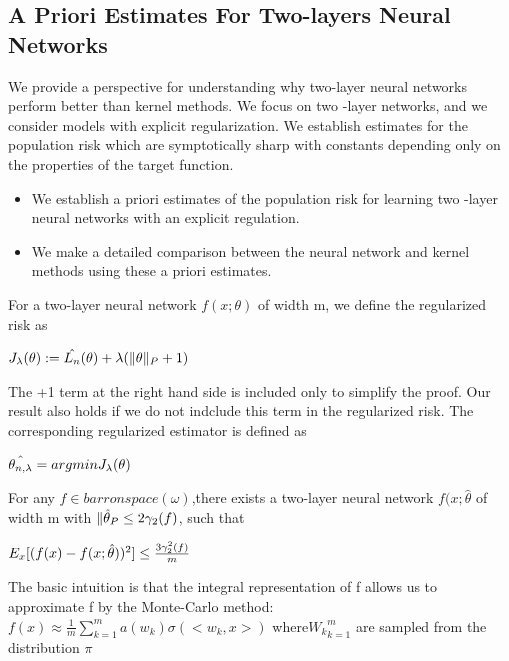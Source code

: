\documentclass{article}
\begin{document}
\subsection{A Priori Estimates For Two-layers Neural Networks}
We provide a perspective for understanding why two-layer neural networks perform better than kernel methods. We focus on two -layer networks, and we consider models with explicit regularization. We establish estimates for the population risk which are symptotically sharp with constants depending only on the properties of the target function. 
\begin{itemize}
\item We establish a priori estimates of the population risk for learning two -layer neural networks with an explicit regulation. 
\item We make a detailed comparison between the neural network and kernel methods using these a priori estimates. 
\end{itemize}

For a two-layer neural network $f(x;\theta)$ of width m, we define the regularized risk as 
\begin{center}
  ${\MakeUppercase{J}_\lambda}(\theta) : = \hat{\MakeUppercase{L}_n}(\theta)+ \lambda(\|\theta\|_P+1)$
\end{center}
The +1 term at the right hand side is included only to simplify the proof. Our result also holds if we do not indclude this term in  the regularized risk. The corresponding regularized estimator is defined as 
\begin{center}
  $\hat{\theta_{n,\lambda}} = argmin{{\MakeUppercase{J}_\lambda}(\theta)}$
\end{center}

For any $f \in barron space(\omega)$,there exists a two-layer neural network $f(x;\hat{\theta}$ of width m with $\|\Hat{\theta}_P\leq 2\gamma_2(f)$, such that
\begin{center}
  $E_x[(f(x)-f(x;\Hat{\theta}))^2]\leq\frac{3\gamma_2^2(f)}{m}$
\end{center}
The basic intuition is that the integral representation of f allows us to approximate f by the Monte-Carlo method:$f(x) \approx\frac{1}{m}\sum_{k=1}^{m} a(w_k){\sigma(<w_k,x>)}$ where${W_k}_{k=1}^m$ are sampled from the distribution $\pi$
\end{document}
